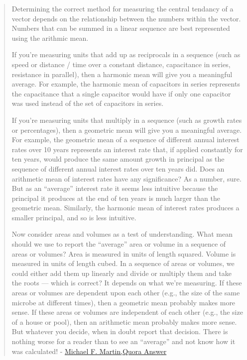 \documentclass[12pt,]{article}
\begin{document}
\begin{quote}
Determining the correct method for measuring the central tendancy of a
vector depends on the relationship between the numbers within the
vector. Numbers that can be summed in a linear sequence are best
represented using the arithmic mean.

If you're measuring units that add up as reciprocals in a sequence (such
as speed or distance / time over a constant distance, capacitance in
series, resistance in parallel), then a harmonic mean will give you a
meaningful average. For example, the harmonic mean of capacitors in
series represents the capacitance that a single capacitor would have if
only one capacitor was used instead of the set of capacitors in series.

If you're measuring units that multiply in a sequence (such as growth
rates or percentages), then a geometric mean will give you a meaningful
average. For example, the geometric mean of a sequence of different
annual interest rates over 10 years represents an interest rate that, if
applied constantly for ten years, would produce the same amount growth
in principal as the sequence of different annual interest rates over ten
years did. Does an arithmetic mean of interest rates have any
significance? As a number, sure. But as an ``average'' interest rate it
seems less intuitive because the principal it produces at the end of ten
years is much larger than the geometric mean. Similarly, the harmonic
mean of interest rates produces a smaller principal, and so is less
intuitive.

Now consider areas and volumes as a test of understanding. What mean
should we use to report the ``average'' area or volume in a sequence of
areas or volumes? Area is measured in units of length squared. Volume is
measured in units of length cubed. In a sequence of areas or volumes, we
could either add them up linearly and divide or multiply them and take
the roots --- which is correct? It depends on what we're measuring. If
these areas or volumes are dependent upon each other (e.g., the size of
the same microbe at different times), then a geometric mean probably
makes more sense. If these areas or volumes are independent of each
other (e.g., the size of a house or pool), then an arithmetic mean
probably makes more sense. But whatever you decide, when in doubt report
that decision. There is nothing worse for a reader than to see an
``average'' and not know how it was calculated! -
\href{https://www.quora.com/When-is-it-most-appropriate-to-take-the-arithmetic-mean-vs-geometric-mean-vs-harmonic-mean}{Michael
F. Martin,Quora Answer}
\end{quote}
\end{document}
